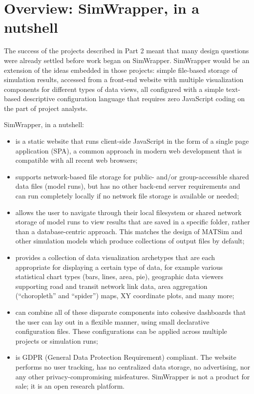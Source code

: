 \hypertarget{simwrapper-overview}{%
\section{Overview: SimWrapper, in a nutshell}
\label{simwrapper-overview}}

The success of the projects described in Part 2 meant that many design questions were already settled before work began on SimWrapper. SimWrapper would be an extension of the ideas embedded in those projects: simple file-based storage of simulation results, accessed from a front-end website with multiple visualization components for different types of data views, all configured with a simple text-based descriptive configuration language that requires zero JavaScript coding on the part of project analysts.

SimWrapper, in a nutshell:

\begin{itemize}
\item
    is a static website that runs client-side JavaScript in the form of
    a single page application (\gls{SPA}), a common approach in modern web
    development that is compatible with all recent web browsers;
\item
    supports network-based file storage for public- and/or
    group-accessible shared data files (model runs), but has no other
    back-end server requirements and can run completely locally if no
    network file storage is available or needed;
\item
    allows the user to navigate through their local filesystem or shared
    network storage of model runs to view results that are saved in a
    specific folder, rather than a database-centric approach. This
    matches the design of MATSim and other simulation models which
    produce collections of output files by default;
\item
    provides a collection of data visualization archetypes that are each
    appropriate for displaying a certain type of data, for example
    various statistical chart types (bars, lines, area, pie), geographic
    data viewers supporting road and transit network link data, area
    aggregation (``choropleth'' and ``spider'') maps, XY coordinate
    plots, and many more;
\item
    can combine all of these disparate components into cohesive
    dashboards that the user can lay out in a flexible manner, using
    small declarative configuration files. These configurations can be
    applied across multiple projects or simulation runs;
\item
    is GDPR (General Data Protection Requirement) compliant. The website performs
    no user tracking, has no centralized data storage,
    no advertising, nor any other privacy-compromising misfeatures.
    SimWrapper is not a product for sale; it is an open research platform.
\end{itemize}

